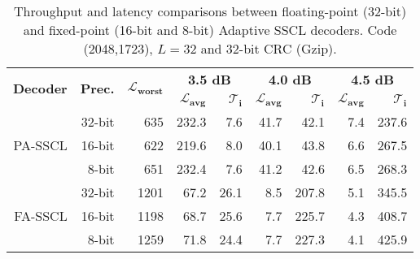 \begin{table}[htp]
  \centering
  \caption{Throughput and latency comparisons between floating-point (32-bit)
    and fixed-point (16-bit and 8-bit) Adaptive SSCL decoders. Code (2048,1723),
    $L = 32$ and 32-bit CRC (Gzip).}
  \label{tab:eval_polar_scl_perfs_fixed}
  \begin{tabular}{r  r  r  r  r |  r  r | r  r}
    \multirow{2}{*}{\textbf{Decoder}} & \multirow{2}{*}{\textbf{Prec.}} & \multirow{2}{*}{$\bm{\mathcal{L}_{worst}}$} & \multicolumn{2}{c|}{\textbf{3.5 dB}} & \multicolumn{2}{c|}{\textbf{4.0 dB}} & \multicolumn{2}{c}{\textbf{4.5 dB}} \\
    \cline{4-9}
    & & & $\bm{\mathcal{L}_{avg}}$ & $\bm{\mathcal{T}_i}$ & $\bm{\mathcal{L}_{avg}}$ & $\bm{\mathcal{T}_i}$ & $\bm{\mathcal{L}_{avg}}$ & $\bm{\mathcal{T}_i}$ \\
    \hline
    \hline
    \multirow{3}{*}{PA-SSCL} & 32-bit &  635 & 232.3 &   7.6 & 41.7 &  42.1 & 7.4 & 237.6 \\
                             & 16-bit &  622 & 219.6 &   8.0 & 40.1 &  43.8 & 6.6 & 267.5 \\
                             &  8-bit &  651 & 232.4 &   7.6 & 41.2 &  42.6 & 6.5 & 268.3 \\
    \hline
    \multirow{3}{*}{FA-SSCL} & 32-bit & 1201 &  67.2 &  26.1 &  8.5 & 207.8 & 5.1 & 345.5 \\
                             & 16-bit & 1198 &  68.7 &  25.6 &  7.7 & 225.7 & 4.3 & 408.7 \\
                             &  8-bit & 1259 &  71.8 &  24.4 &  7.7 & 227.3 & 4.1 & 425.9 \\
  \end{tabular}
\end{table}


